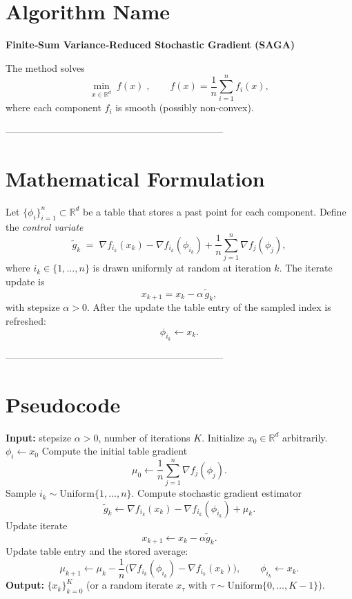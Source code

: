 \documentclass{article}
\newcommand{\grad}{\nabla}
\begin{document}
\section*{Algorithm Name}
\textbf{Finite‑Sum Variance‑Reduced Stochastic Gradient (SAGA)}  

The method solves 
\[
\min_{x\in\mathbb{R}^{d}} \; f(x)\;,\qquad 
f(x)=\frac1n\sum_{i=1}^{n} f_i(x),
\]
where each component $f_i$ is smooth (possibly non‑convex).

--------------------------------------------------------------------

\section*{Mathematical Formulation}
Let $\{\phi_i\}_{i=1}^{n}\subset\mathbb{R}^{d}$ be a table that stores a past point for each component.
Define the \emph{control variate}
\[
\tilde g_k \;=\; \grad f_{i_k}(x_k)-\grad f_{i_k}(\phi_{i_k})
      +\frac1n\sum_{j=1}^{n}\grad f_{j}(\phi_{j}),
\tag{1}
\]
where $i_k\in\{1,\dots,n\}$ is drawn uniformly at random at iteration $k$.
The iterate update is
\[
x_{k+1}=x_k-\alpha \,\tilde g_k,
\tag{2}
\]
with stepsize $\alpha>0$.  
After the update the table entry of the sampled index is refreshed:
\[
\phi_{i_k}\leftarrow x_k .
\tag{3}
\]

--------------------------------------------------------------------

\section*{Pseudocode}
\begin{algorithm}[H]
\caption{SAGA for Non‑Convex Finite Sums}
\begin{algorithmic}[1]
\STATE \textbf{Input:} stepsize $\alpha>0$, number of iterations $K$.
\STATE Initialize $x_0\in\mathbb{R}^{d}$ arbitrarily.
    \STATE $\phi_i \leftarrow x_0$ 
\ENDFOR
\STATE Compute the initial table gradient 
\[
\mu_0 \gets \frac1n\sum_{j=1}^{n}\grad f_j(\phi_j).
\]
    \STATE Sample $i_k\sim\text{Uniform}\{1,\dots,n\}$.
    \STATE Compute stochastic gradient estimator 
    \[
    \tilde g_k \gets \grad f_{i_k}(x_k)-\grad f_{i_k}(\phi_{i_k})+\mu_k .
    \]
    \STATE Update iterate 
    \[
    x_{k+1}\gets x_k-\alpha \tilde g_k .
    \]
    \STATE Update table entry and the stored average:
    \[
    \mu_{k+1}\gets \mu_k
          -\frac{1}{n}\bigl(\grad f_{i_k}(\phi_{i_k})-\grad f_{i_k}(x_k)\bigr),
    \qquad
    \phi_{i_k}\gets x_k .
    \]
\ENDFOR
\STATE \textbf{Output:} $\{x_k\}_{k=0}^{K}$ (or a random iterate $x_{\tau}$ with $\tau\sim\text{Uniform}\{0,\dots,K-1\}$).
\end{algorithmic}
\end{algorithm}
\end{document}
